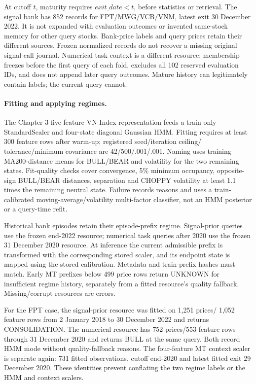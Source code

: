 At cutoff $t$, maturity requires $exit\_date<t$, before statistics or
retrieval. The signal bank has 852 records for FPT/MWG/VCB/VNM, latest exit
30 December 2022. It is not expanded with evaluation outcomes or invented
same-stock memory for other query stocks. Bank-price labels and query
prices retain their different sources. Frozen normalized records do not
recover a missing original signal-call journal. Numerical task context is
a different resource: membership freezes before the first query of each
fold, excludes all 102 reserved evaluation IDs, and does not append later
query outcomes. Mature history can legitimately contain labels; the
current query cannot.

\paragraph{Fitting and applying regimes.}
The Chapter 3 five-feature VN-Index representation feeds a train-only
StandardScaler and four-state diagonal Gaussian HMM. Fitting requires at
least 300 feature rows after warm-up; registered seed/iteration ceiling/
tolerance/minimum covariance are 42/500/.001/.001. Naming uses training
MA200-distance means for BULL/BEAR and volatility for the two remaining
states. Fit-quality checks cover convergence, 5\% minimum occupancy,
opposite-sign BULL/BEAR distances, separation and CHOPPY volatility at
least 1.1 times the remaining neutral state. Failure records reasons and
uses a train-calibrated moving-average/volatility multi-factor classifier,
not an HMM posterior or a query-time refit.

Historical bank episodes retain their episode-prefix regime. Signal-prior
queries use the frozen end-2022 resource; numerical task queries after
2020 use the frozen 31 December 2020 resource. At inference the current
admissible prefix is transformed with the corresponding stored scaler,
and its endpoint state is mapped using the stored calibration. Metadata
and train-prefix hashes must match. Early MT prefixes below 499 price
rows return UNKNOWN for insufficient regime history, separately from a
fitted resource's quality fallback. Missing/corrupt resources are errors.

For the FPT case, the signal-prior resource was fitted on 1,251 prices/
1,052 feature rows from 2 January 2018 to 30 December 2022 and returns
CONSOLIDATION. The numerical resource has 752 prices/553 feature rows
through 31 December 2020 and returns BULL at the same query. Both record
HMM mode without quality-fallback reasons. The four-feature MT context
scaler is separate again: 731 fitted observations, cutoff end-2020 and
latest fitted exit 29 December 2020. These identities prevent conflating
the two regime labels or the HMM and context scalers.

